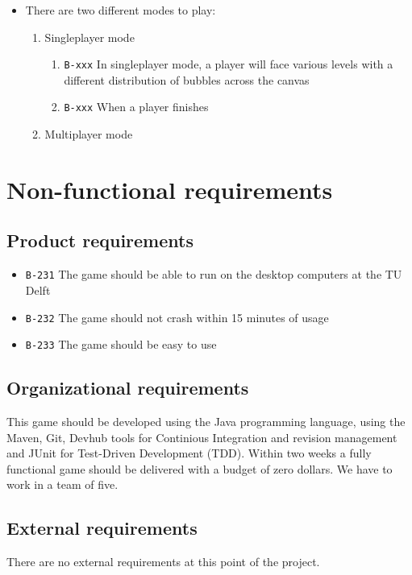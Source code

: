 \documentclass[a4paper]{article}
\begin{document}
\begin{itemize}
  \item There are two different modes to play:
  \begin{enumerate}
      \item Singleplayer mode
      \begin{enumerate}
          \item \texttt{B-xxx} In singleplayer mode, a player will face various levels with a different distribution of bubbles across the canvas
          \item \texttt{B-xxx} When a player finishes 
      \end{enumerate}
      
      
      \item Multiplayer mode
      
  \end{enumerate}


\end{itemize}

\section{Non-functional requirements}
\subsection{Product requirements}

\begin{itemize}
  \item \texttt{B-231} The game should be able to run on the desktop computers at the TU Delft
  \item \texttt{B-232} The game should not crash within 15 minutes of usage
  \item \texttt{B-233} The game should be easy to use
\end{itemize}

\subsection{Organizational requirements}
This game should be developed using the Java programming language, using the Maven, Git, Devhub tools for Continious Integration and revision management and JUnit for Test-Driven Development (TDD). Within two weeks a fully functional game should be delivered with a budget of zero dollars. We have to work in a team of five.

\subsection{External requirements}
There are no external requirements at this point of the project.
\end{document}
